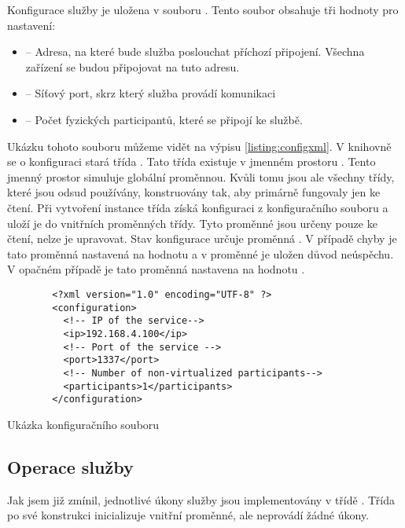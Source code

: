 Konfigurace služby je uložena v souboru . Tento soubor obsahuje tři hodnoty pro nastavení:

\begin{itemize}
    \item {} -- Adresa, na které bude služba poslouchat příchozí připojení. Všechna zařízení se budou připojovat na tuto adresu.
    \item {} -- Síťový port, skrz který služba provádí komunikaci
    \item {} -- Počet fyzických participantů, které se připojí ke službě.   
\end{itemize}

Ukázku tohoto souboru můžeme vidět na výpisu \ref{listing:configxml}. V knihovně se o konfiguraci stará třída . Tato třída existuje v jmenném prostoru . Tento jmenný prostor simuluje globální proměnnou. Kvůli tomu jsou ale všechny třídy, které jsou odsud používány, konstruovány tak, aby primárně fungovaly jen ke čtení. Při vytvoření instance třída získá konfiguraci z konfiguračního souboru a uloží je do vnitřních proměnných třídy. Tyto proměnné jsou určeny pouze ke čtení, nelze je upravovat. Stav konfigurace určuje proměnná . V případě chyby je tato proměnná nastavená na hodnotu  a v proměnné  je uložen důvod neúspěchu. V opačném případě je tato proměnná nastavena na hodnotu .

\begin{listing}[htbp]
    \centering
    \begin{verbatim}
        <?xml version="1.0" encoding="UTF-8" ?>
        <configuration>
          <!-- IP of the service-->
          <ip>192.168.4.100</ip>
          <!-- Port of the service -->
          <port>1337</port>
          <!-- Number of non-virtualized participants-->
          <participants>1</participants>
        </configuration>
    \end{verbatim}
    \caption{Ukázka konfiguračního souboru}
    \label{listing:configxml}
\end{listing}


\subsection{Operace služby}

Jak jsem již zmínil, jednotlivé úkony služby jsou implementovány v třídě . Třída po své konstrukci inicializuje vnitřní proměnné, ale neprovádí žádné úkony. 

